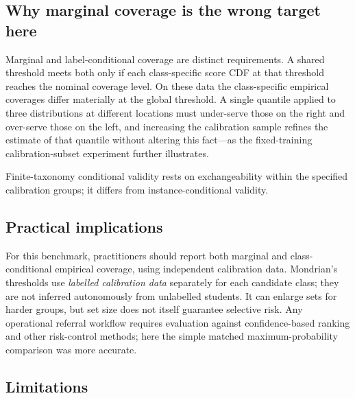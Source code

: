 \subsection{Why marginal coverage is the wrong target here}

Marginal and label-conditional coverage are distinct requirements. A shared
threshold meets both only if each class-specific score CDF at that threshold
reaches the nominal coverage level. On these data the class-specific empirical coverages differ materially
at the global threshold. A single quantile applied to three distributions at different locations must
under-serve those on the right and over-serve those on the left, and increasing
the calibration sample refines the estimate of that quantile without altering
this fact---as the fixed-training calibration-subset experiment further illustrates.

Finite-taxonomy conditional validity rests on exchangeability within
the specified calibration groups; it differs from instance-conditional validity.

\subsection{Practical implications}

For this benchmark, practitioners should report both marginal and
class-conditional empirical coverage, using independent calibration data.
Mondrian's thresholds use \emph{labelled calibration data} separately for each
candidate class; they are not inferred autonomously from unlabelled students.
It can enlarge sets for harder groups, but set size does not itself guarantee
selective risk. Any operational referral workflow requires evaluation against
confidence-based ranking and other risk-control methods; here the simple
matched maximum-probability comparison was more accurate.

\noindent{}

\subsection{Limitations}

